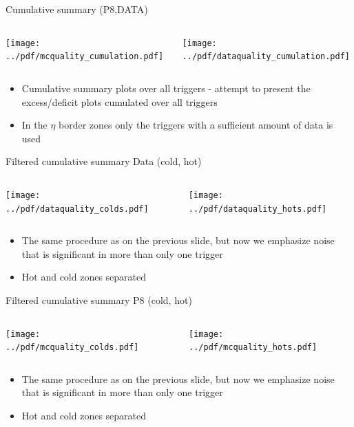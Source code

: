 \documentclass[9pt]{beamer}
\begin{document}
\begin{frame}[t]{Cumulative summary (P8,DATA)}
\begin{columns}[T]
  \begin{column}{.5\textwidth}
  \texttt{[image: ../pdf/mcquality\_cumulation.pdf]}
  \end{column}
  \begin{column}{.5\textwidth}
  \texttt{[image: ../pdf/dataquality\_cumulation.pdf]}
  \end{column}
\end{columns}
\begin{itemize}
 \item Cumulative summary plots over all triggers - attempt to present the excess/deficit plots cumulated over all triggers
 \item In the $\eta$ border zones only the triggers with a sufficient amount of data is used
\end{itemize}
\end{frame}

\begin{frame}[t]{Filtered cumulative summary Data (cold, hot)}
\begin{columns}[T]
  \begin{column}{.5\textwidth}
  \texttt{[image: ../pdf/dataquality\_colds.pdf]}
  \end{column}
  \begin{column}{.5\textwidth}
  \texttt{[image: ../pdf/dataquality\_hots.pdf]}
  \end{column}
\end{columns}
\begin{itemize}
 \item The same procedure as on the previous slide, but now we emphasize noise that is significant in more than only one trigger
 \item Hot and cold zones separated
\end{itemize}
\end{frame}

\begin{frame}[t]{Filtered cumulative summary P8 (cold, hot)}
\begin{columns}[T]
  \begin{column}{.5\textwidth}
  \texttt{[image: ../pdf/mcquality\_colds.pdf]}
  \end{column}
  \begin{column}{.5\textwidth}
  \texttt{[image: ../pdf/mcquality\_hots.pdf]}
  \end{column}
\end{columns}
\begin{itemize}
 \item The same procedure as on the previous slide, but now we emphasize noise that is significant in more than only one trigger
 \item Hot and cold zones separated
\end{itemize}
\end{frame}
\end{document}
